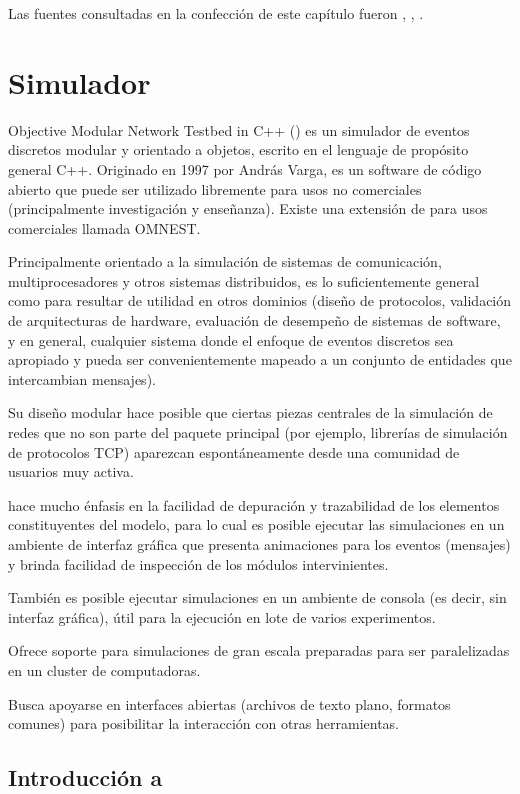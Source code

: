 Las fuentes consultadas en la confección de este capítulo fueron \cite{law},
\cite{banks}, \cite{shannon}.

\section{Simulador \omnetpp{}}

Objective Modular Network Testbed in C++ (\omnetpp{}) es un simulador de eventos
discretos modular y orientado a objetos, escrito en el lenguaje de propósito
general C++. Originado en 1997 por András Varga, es un software de código
abierto que puede ser utilizado libremente para usos no comerciales
(principalmente investigación y enseñanza). Existe una extensión de \omnetpp{}
para usos comerciales llamada OMNEST.

Principalmente orientado a la simulación de sistemas de comunicación,
multiprocesadores y otros sistemas distribuidos, \omnetpp{} es lo suficientemente
general como para resultar de utilidad en otros dominios (diseño de protocolos,
validación de arquitecturas de hardware, evaluación de desempeño de sistemas de
software, y en general, cualquier sistema donde el enfoque de eventos discretos
sea apropiado y pueda ser convenientemente mapeado a un conjunto de entidades
que intercambian mensajes).

Su diseño modular hace posible que ciertas piezas centrales de la simulación de
redes que no son parte del paquete principal (por ejemplo, librerías de
simulación de protocolos TCP) aparezcan espontáneamente desde una comunidad de
usuarios muy activa.

\omnetpp{} hace mucho énfasis en la facilidad de depuración y trazabilidad de
los elementos constituyentes del modelo, para lo cual es posible ejecutar las
simulaciones en un ambiente de interfaz gráfica que presenta animaciones para
los eventos (mensajes) y brinda facilidad de inspección de los módulos
intervinientes.

También es posible ejecutar simulaciones en un ambiente de consola (es decir,
sin interfaz gráfica), útil para la ejecución en lote de varios experimentos.

Ofrece soporte para simulaciones de gran escala preparadas para ser
paralelizadas en un cluster de computadoras.

Busca apoyarse en interfaces abiertas (archivos de texto plano, formatos
comunes) para posibilitar la interacción con otras herramientas.

\subsection{Introducción a \omnetpp{}}

